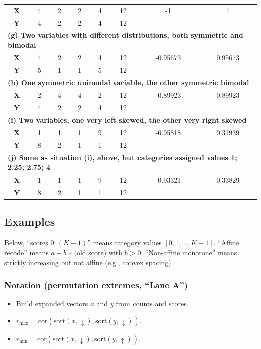 \documentclass[
  12pt,
]{article}
\theoremstyle{plain}
\theoremstyle{definition}
\theoremstyle{remark}
\begin{document}
\begin{table}[H]
\begin{tabular}{c|cccc|c|cc}
\textbf{X} & 4 & 2 & 2 & 4 & 12 & -1 & 1 \\
\textbf{Y} & 4 & 2 & 2 & 4 & 12 & & \\
\hline
\multicolumn{8}{l}{\textbf{(g) Two variables with different distributions, both symmetric and bimodal}} \\
\textbf{X} & 4 & 2 & 2 & 4 & 12 & -0.95673 & 0.95673 \\
\textbf{Y} & 5 & 1 & 1 & 5 & 12 & & \\
\hline
\multicolumn{8}{l}{\textbf{(h) One symmetric unimodal variable, the other symmetric bimodal}} \\
\textbf{X} & 2 & 4 & 4 & 2 & 12 & -0.89923 & 0.89923 \\
\textbf{Y} & 4 & 2 & 2 & 4 & 12 & & \\
\hline
\multicolumn{8}{l}{\textbf{(i) Two variables, one very left skewed, the other very right skewed}} \\
\textbf{X} & 1 & 1 & 1 & 9 & 12 & -0.95818 & 0.31939 \\
\textbf{Y} & 8 & 2 & 1 & 1 & 12 & & \\
\hline
\multicolumn{8}{l}{\textbf{(j) Same as situation (i), above, but categories assigned values 1; 2.25; 2.75; 4}} \\
\textbf{X} & 1 & 1 & 1 & 9 & 12 & -0.93321 & 0.33829 \\
\textbf{Y} & 8 & 2 & 1 & 1 & 12 & & \\
\hline
\end{tabular}

\end{table}

\subsection{Examples}\label{examples}

Below, ``scores \(0{:}(K-1)\)'' means category values
\([0,1,\dots,K-1]\). ``Affine recode'' means
\(a+b\times\text{(old score)}\) with \(b>0\). ``Non-affine monotone''
means strictly increasing but not affine (e.g., convex spacing).

\subsubsection{Notation (permutation extremes, ``Lane
A'')}\label{notation-permutation-extremes-lane-a}

\begin{itemize}
\item
  Build expanded vectors \(x\) and \(y\) from counts and scores.
\item
  \(r_{\max}=\mathrm{cor}(\text{sort}(x,\downarrow),\text{sort}(y,\downarrow))\).
\item
  \(r_{\min}=\mathrm{cor}(\text{sort}(x,\downarrow),\text{sort}(y,\uparrow))\).
\end{itemize}
\end{document}
